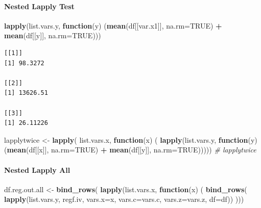 \documentclass[
]{book}
\newenvironment{Shaded}{\begin{snugshade}}{\end{snugshade}}
\newcommand{\CommentTok}[1]{\textcolor[rgb]{0.56,0.35,0.01}{\textit{#1}}}
\newcommand{\ControlFlowTok}[1]{\textcolor[rgb]{0.13,0.29,0.53}{\textbf{#1}}}
\newcommand{\DataTypeTok}[1]{\textcolor[rgb]{0.13,0.29,0.53}{#1}}
\newcommand{\KeywordTok}[1]{\textcolor[rgb]{0.13,0.29,0.53}{\textbf{#1}}}
\newcommand{\NormalTok}[1]{#1}
\newcommand{\OperatorTok}[1]{\textcolor[rgb]{0.81,0.36,0.00}{\textbf{#1}}}
\newcommand{\OtherTok}[1]{\textcolor[rgb]{0.56,0.35,0.01}{#1}}
\newcommand{\StringTok}[1]{\textcolor[rgb]{0.31,0.60,0.02}{#1}}
\begin{document}
\hypertarget{nested-lapply-test}{%
\paragraph{Nested Lapply Test}\label{nested-lapply-test}}

\begin{Shaded}
\begin{Highlighting}[]
\KeywordTok{lapply}\NormalTok{(list.vars.y, }\ControlFlowTok{function}\NormalTok{(y) (}\KeywordTok{mean}\NormalTok{(df[[var.x1]], }\DataTypeTok{na.rm=}\OtherTok{TRUE}\NormalTok{) }\OperatorTok{+}
\StringTok{                                   }\KeywordTok{mean}\NormalTok{(df[[y]], }\DataTypeTok{na.rm=}\OtherTok{TRUE}\NormalTok{)))}
\end{Highlighting}
\end{Shaded}

\begin{verbatim}
[[1]]
[1] 98.3272

[[2]]
[1] 13626.51

[[3]]
[1] 26.11226
\end{verbatim}

\begin{Shaded}
\begin{Highlighting}[]
\NormalTok{lapplytwice <-}\StringTok{ }\KeywordTok{lapply}\NormalTok{(}
\NormalTok{  list.vars.x, }\ControlFlowTok{function}\NormalTok{(x) (}
    \KeywordTok{lapply}\NormalTok{(list.vars.y, }\ControlFlowTok{function}\NormalTok{(y) (}\KeywordTok{mean}\NormalTok{(df[[x]], }\DataTypeTok{na.rm=}\OtherTok{TRUE}\NormalTok{) }\OperatorTok{+}
\StringTok{                                       }\KeywordTok{mean}\NormalTok{(df[[y]], }\DataTypeTok{na.rm=}\OtherTok{TRUE}\NormalTok{)))))}
\CommentTok{# lapplytwice}
\end{Highlighting}
\end{Shaded}

\hypertarget{nested-lapply-all}{%
\paragraph{Nested Lapply All}\label{nested-lapply-all}}

\begin{Shaded}
\begin{Highlighting}[]
\NormalTok{df.reg.out.all <-}\StringTok{ }\KeywordTok{bind_rows}\NormalTok{(}
  \KeywordTok{lapply}\NormalTok{(list.vars.x,}
         \ControlFlowTok{function}\NormalTok{(x) (}
           \KeywordTok{bind_rows}\NormalTok{(}
             \KeywordTok{lapply}\NormalTok{(list.vars.y, regf.iv,}
                    \DataTypeTok{vars.x=}\NormalTok{x, }\DataTypeTok{vars.c=}\NormalTok{vars.c, }\DataTypeTok{vars.z=}\NormalTok{vars.z, }\DataTypeTok{df=}\NormalTok{df))}
\NormalTok{         )))}
\end{Highlighting}
\end{Shaded}
\end{document}
